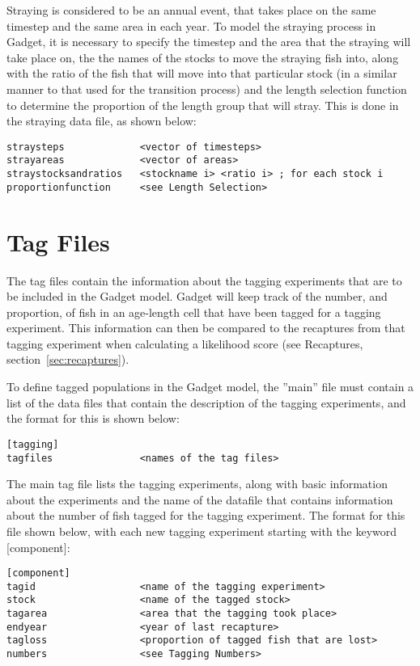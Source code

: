 \documentclass[10pt,twoside]{book}
\begin{document}
\bigskip
Straying is considered to be an annual event, that takes place on the same timestep and the same area in each year.  To model the straying process in Gadget, it is necessary to specify the timestep and the area that the straying will take place on, the the names of the stocks to move the straying fish into, along with the ratio of the fish that will move into that particular stock (in a similar manner to that used for the transition process) and the length selection function to determine the proportion of the length group that will stray.  This is done in the straying data file, as shown below:

{\small\begin{verbatim}
straysteps             <vector of timesteps>
strayareas             <vector of areas>
straystocksandratios   <stockname i> <ratio i> ; for each stock i
proportionfunction     <see Length Selection>
\end{verbatim}}

\chapter{Tag Files}\label{chap:tag}
The tag files contain the information about the tagging experiments that are to be included in the Gadget model.  Gadget will keep track of the number, and proportion, of fish in an age-length cell that have been tagged for a tagging experiment.  This information can then be compared to the recaptures from that tagging experiment when calculating a likelihood score (see Recaptures, section~\ref{sec:recaptures}).

\bigskip
To define tagged populations in the Gadget model, the ''main'' file must contain a list of the data files that contain the description of the tagging experiments, and the format for this is shown below:

{\small\begin{verbatim}
[tagging]
tagfiles               <names of the tag files>
\end{verbatim}}

The main tag file lists the tagging experiments, along with basic information about the experiments and the name of the datafile that contains information about the number of fish tagged for the tagging experiment.  The format for this file shown below, with each new tagging experiment starting with the keyword [component]:

{\small\begin{verbatim}
[component]
tagid                  <name of the tagging experiment>
stock                  <name of the tagged stock>
tagarea                <area that the tagging took place>
endyear                <year of last recapture>
tagloss                <proportion of tagged fish that are lost>
numbers                <see Tagging Numbers>
\end{verbatim}}
\end{document}
